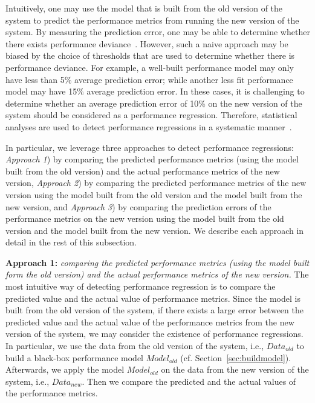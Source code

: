 Intuitively, one may use the model that is built from the old version of the system to predict the performance metrics from running the new version of the system. By measuring the prediction error, one may be able to determine whether there exists performance deviance~\citep{DBLP:conf/osdi/CohenCGKS04,DBLP:conf/wosp/NguyenAJHNF12}. However, such a naive approach may be biased by the choice of thresholds that are used to determine whether there is performance deviance. For example, a well-built performance model may only have less than 5\% average prediction error; while another less fit performance model may have 15\% average prediction error. In these cases, it is challenging to determine whether an average prediction error of 10\% on the new version of the system should be considered as a performance regression. Therefore, statistical analyses are used to detect performance regressions in a systematic manner~\citep{DBLP:conf/icst/GaoJBL16,DBLP:conf/wosp/ShangHNF15,Foo:2015:ICS:2819009.2819034}. 

In particular, we leverage three approaches to detect performance regressions: \emph{Approach 1}) by comparing the predicted performance metrics (using the model built from the old version) and the actual performance metrics of the new version, \emph{Approach 2}) by comparing the predicted performance metrics of the new version using the model built from the old version and the model built from the new version, and \emph{Approach 3}) by comparing the prediction errors of the performance metrics on the new version using the model built from the old version and the model built from the new version. We describe each approach in detail in the rest of this subsection.

\noindent\textbf{Approach 1: }\emph{comparing the predicted performance metrics (using the model built form the old version) and the actual performance metrics of the new version.} %
The most intuitive way of detecting performance regression is to compare the predicted value and the actual value of performance metrics. Since the model is built from the old version of the system, if there exists a large error between the predicted value and the actual value of the performance metrics from the new version of the system, we may consider the existence of performance regressions. In particular, we use the data from the old version of the system, i.e., $Data_{old}$ to build a black-box performance model $Model_{old}$ (cf. Section~\ref{sec:buildmodel}). Afterwards, we apply the model $Model_{old}$ on the data from the new version of the system, i.e., $Data_{new}$. Then we compare the predicted and the actual values of the performance metrics.


